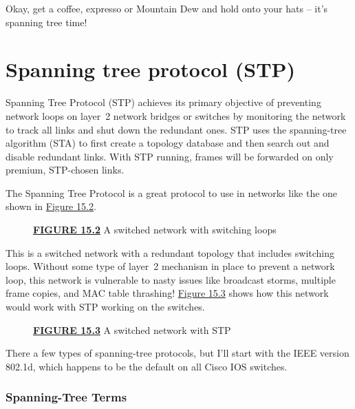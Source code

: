 Okay, get a coffee, expresso or Mountain Dew and hold onto your
hats -- it's spanning tree time!

\section{Spanning tree protocol (STP)}

Spanning Tree Protocol (STP) achieves its primary objective of
preventing network loops on layer~2 network bridges or switches by
monitoring the network to track all links and shut down the redundant
ones. STP uses the spanning-tree algorithm (STA) to first create a
topology database and then search out and disable redundant links. With
STP running, frames will be forwarded on only premium, STP-chosen links.

The Spanning Tree Protocol is a great protocol to use in networks like
the one shown in \protect\hyperlink{c15.xhtmlux5cux23figure15-2}{Figure
15.2}.



\begin{figure}
\centering
\caption{{\protect\hyperlink{c15.xhtmlux5cux23figureanchor15-2}{\textbf{FIGURE
15.2}} A switched network with switching loops}}
\end{figure}

This is a switched network with a redundant topology that includes
switching loops. Without some type of layer~2 mechanism in place to
prevent a network loop, this network is vulnerable to nasty issues like
broadcast storms, multiple frame copies, and MAC table thrashing!
\protect\hyperlink{c15.xhtmlux5cux23figure15-3}{Figure 15.3} shows how
this network would work with STP working on the switches.

\begin{figure}
\centering
\caption{{\protect\hyperlink{c15.xhtmlux5cux23figureanchor15-3}{\textbf{FIGURE
15.3}} A switched network with STP}}
\end{figure}

There a few types of spanning-tree protocols, but I'll start with the IEEE version 802.1d, which happens to be the default on all Cisco IOS switches.

\subsubsection[Spanning-Tree
Terms]{\texorpdfstring{\protect\hypertarget{c15.xhtmlux5cux23c15-sec-10}{}{}Spanning-Tree
Terms}{Spanning-Tree Terms}}

